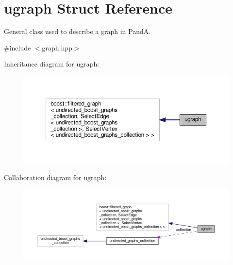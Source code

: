 \hypertarget{structugraph}{}\section{ugraph Struct Reference}
\label{structugraph}


General class used to describe a graph in PandA.  




{\ttfamily \#include $<$graph.\+hpp$>$}



Inheritance diagram for ugraph\+:
\nopagebreak
\begin{figure}[H]
\begin{center}
\leavevmode
\includegraphics[width=350pt]{de/d53/structugraph__inherit__graph}
\end{center}
\end{figure}


Collaboration diagram for ugraph\+:
\nopagebreak
\begin{figure}[H]
\begin{center}
\leavevmode
\includegraphics[width=350pt]{d3/d25/structugraph__coll__graph}
\end{center}
\end{figure}
